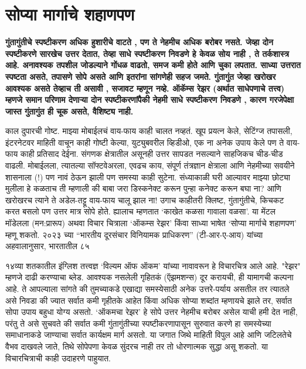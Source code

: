 \chapter{सोप्या मार्गाचे शहाणपण}

\textcolor{blue!60!black}{\textbf{गुंतागुंतीचे स्पष्टीकरण अधिक हुशारीचे वाटते , पण ते नेहमीच अधिक बरोबर नसते. जेव्हा दोन स्पष्टीकरणे सारखेच उत्तर देतात, तेव्हा साधे स्पष्टीकरण निवडणे हे केवळ सोय नाही , ते तर्कशास्त्र आहे. अनावश्यक तपशील जोडल्याने गोंधळ वाढतो, समज कमी होते आणि चुका लपतात. साध्या उत्तरात स्पष्टता असते, तपासणे सोपे असते आणि इतरांना सांगणेही सहज जमते. गुंतागुंत जेव्हा खरोखर आवश्यक असते तेव्हाच ती असावी , सजावट म्हणून नव्हे. ऑकॅम्स रेझर (अर्थात साधेपणाचे तत्त्व) म्हणजे समान परिणाम देणाऱ्या दोन स्पष्टीकरणांपैकी नेहमी साधे स्पष्टीकरण निवडणे , कारण गरजेपेक्षा जास्त गुंतागुंत ही चूक असते, वैशिष्ट्य नाही.}}

काल दुपारची गोष्ट. माझ्या मोबाईलचं वाय-फाय काही चालत नव्हतं. खूप प्रयत्न केले, सेटिंग्ज तपासली, इंटरनेटवर माहिती वाचून काही गोष्टी केल्या, युट्युबवरील व्हिडीओ, एक ना अनेक उपाय केले पण ते वाय-फाय काही प्रतिसाद देईना. संगणक क्षेत्रातील असूनही उत्तर सापडत नसल्याने साहजिकच चीड-चीड वाढली. मोबाईलला, त्यातल्या सॉफ्टवेअरला, एवढच काय, संपूर्ण तंत्रज्ञान क्षेत्राला आणि नेहमीच्या सवयीने शासनाला (!) पण नावं  ठेऊन झाली पण समस्या काही सुटेना. संध्याकाळी घरी आल्यावर माझ्या छोट्या मुलीला हे कळताच ती म्हणाली की बाबा जरा डिस्कनेक्ट करून पुन्हा कनेक्ट करून बघा ना? आणि खरोखरच त्याने ते अडेल-तट्टू वाय-फाय चालू झाल ना! उगाच काहीतरी क्लिष्ट, गुंतागुंतीचे, किचकट करत बसलो पण उत्तर मात्र सोपे होते. ह्यालाच म्हणतात ‘काखेत कळसा गावाला वळसा’. या मेंटल मॉडेलला (मन:प्रारूप) अथवा विचार चित्राला ‘ऑकम्स रेझर’ किंवा साध्या भाषेत ‘सोप्या मार्गाचे शहाणपण’ म्हणू शकतो. २०२३ च्या “भारतीय दूरसंचार विनियामक प्राधिकरण” (टी-आर-ए-आय)  यांच्या अहवालानुसार, भारतातील ८५%

१४व्या शतकातील इंग्लिश तत्त्वज्ञ ‘विल्यम ऑफ ऑकम’ यांच्या नावावरून हे विचारचित्र आले आहे. "रेझर" म्हणजे दाढी करण्याचा ब्लेड. आवश्यक  नसलेली गृहितकं (ऍझमशन्स) दूर करायची, ही यामागची कल्पना आहे. ते आपल्याला सांगते की तुमच्याकडे एखाद्या समस्येसाठी अनेक उत्तरे-पर्याय असतील तर त्यातले असे निवडा की ज्यात सर्वात कमी गृहीतके आहेत किंवा अधिक सोप्या शब्दांत म्हणायचे झाले तर, सर्वात सोपा उपाय बहुधा योग्य असतो. ‘ऑकमचा रेझर’ हे सोपे उत्तर नेहमीच बरोबर असेल याची हमी देत नाही, परंतु ते असे सुचवते की सर्वात कमी गुंतागुंतीच्या स्पष्टीकरणापासून सुरुवात करणे हा समस्येच्या समाधानाकडे जाण्याचा सर्वात कार्यक्षम मार्ग असतो. या जगात जिथे माहिती विपुल आहे आणि जटिलतेचे वैभव दाखवले जाते, तिथे सोपेपणा केवळ सुंदरच नाही तर तो धोरणात्मक सुद्धा असू शकतो. या विचारचित्राची काही उदाहरणे पाहुयात. 

